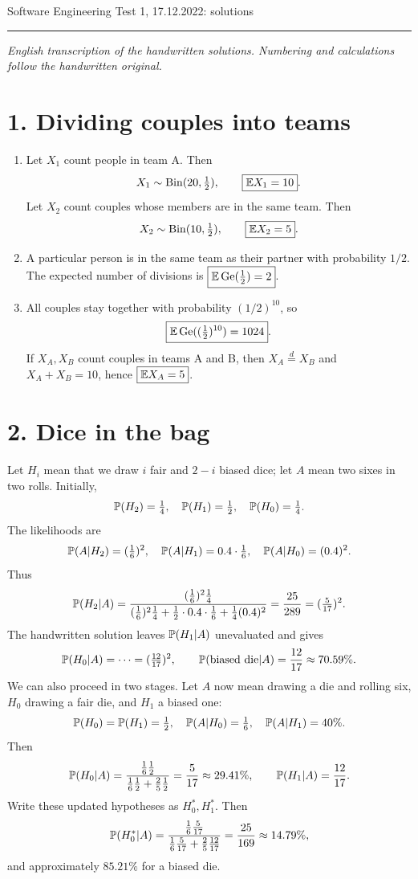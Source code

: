 \documentclass[a4paper]{article}
\begin{document}
\noindent Software Engineering \hfill Test 1, 17.12.2022: solutions
\par\smallskip\hrule\smallskip\noindent

\textit{English transcription of the handwritten solutions. Numbering and calculations follow the handwritten original.}

\section*{1. Dividing couples into teams}
\begin{enumerate}
\item Let $X_1$ count people in team A. Then
\[
X_1\sim\operatorname{Bin}(20,\tfrac12),\qquad \boxed{\E X_1=10}.
\]
Let $X_2$ count couples whose members are in the same team. Then
\[
X_2\sim\operatorname{Bin}(10,\tfrac12),\qquad \boxed{\E X_2=5}.
\]
\item A particular person is in the same team as their partner with probability $1/2$. The expected number of divisions is $\boxed{\E\operatorname{Ge}(\tfrac12)=2}$.
\item All couples stay together with probability $(1/2)^{10}$, so
\[
\boxed{\E\operatorname{Ge}((\tfrac12)^{10})=1024}.
\]
If $X_A,X_B$ count couples in teams A and B, then $X_A\stackrel d=X_B$ and $X_A+X_B=10$, hence $\boxed{\E X_A=5}$.
\end{enumerate}

\section*{2. Dice in the bag}
Let $H_i$ mean that we draw $i$ fair and $2-i$ biased dice; let $A$ mean two sixes in two rolls. Initially,
\[
\P(H_2)=\tfrac14,\quad \P(H_1)=\tfrac12,\quad \P(H_0)=\tfrac14.
\]
The likelihoods are
\[
\P(A|H_2)=(\tfrac16)^2,\quad \P(A|H_1)=0.4\cdot\tfrac16,\quad \P(A|H_0)=(0.4)^2.
\]
Thus
\[
\P(H_2|A)=\frac{(\frac16)^2\frac14}
{(\frac16)^2\frac14+\frac12\cdot0.4\cdot\frac16+\frac14(0.4)^2}
=\frac{25}{289}=(\tfrac5{17})^2.
\]
The handwritten solution leaves $\P(H_1|A)$ unevaluated and gives
\[
\P(H_0|A)=\dots=(\tfrac{12}{17})^2,\qquad
\P(\text{biased die}|A)=\frac{12}{17}\approx70.59\%.
\]
We can also proceed in two stages. Let $A$ now mean drawing a die and rolling six, $H_0$ drawing a fair die, and $H_1$ a biased one:
\[
\P(H_0)=\P(H_1)=\tfrac12,\quad \P(A|H_0)=\tfrac16,\quad \P(A|H_1)=40\%.
\]
Then
\[
\P(H_0|A)=\frac{\frac16\frac12}{\frac16\frac12+\frac25\frac12}
=\frac5{17}\approx29.41\%,\qquad \P(H_1|A)=\frac{12}{17}.
\]
Write these updated hypotheses as $H_0^*,H_1^*$. Then
\[
\P(H_0^*|A)=\frac{\frac16\frac5{17}}{\frac16\frac5{17}+\frac25\frac{12}{17}}
=\frac{25}{169}\approx14.79\%,
\]
and approximately $85.21\%$ for a biased die.
\end{document}
